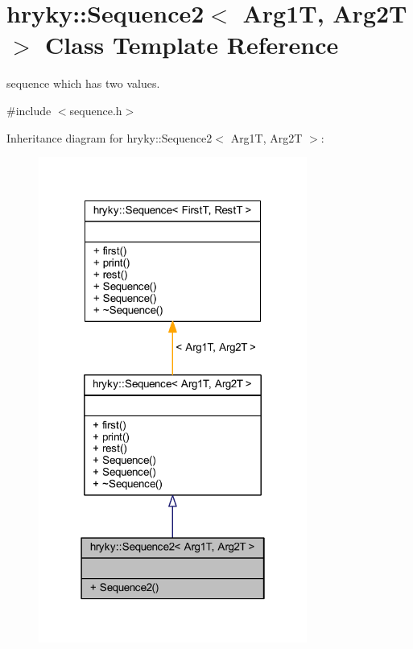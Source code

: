 \hypertarget{classhryky_1_1_sequence2}{\section{hryky\-:\-:Sequence2$<$ Arg1\-T, Arg2\-T $>$ Class Template Reference}
\label{classhryky_1_1_sequence2}
}


sequence which has two values.  




{\ttfamily \#include $<$sequence.\-h$>$}



Inheritance diagram for hryky\-:\-:Sequence2$<$ Arg1\-T, Arg2\-T $>$\-:\nopagebreak
\begin{figure}[H]
\begin{center}
\leavevmode
\includegraphics[width=250pt]{classhryky_1_1_sequence2__inherit__graph}
\end{center}
\end{figure}
